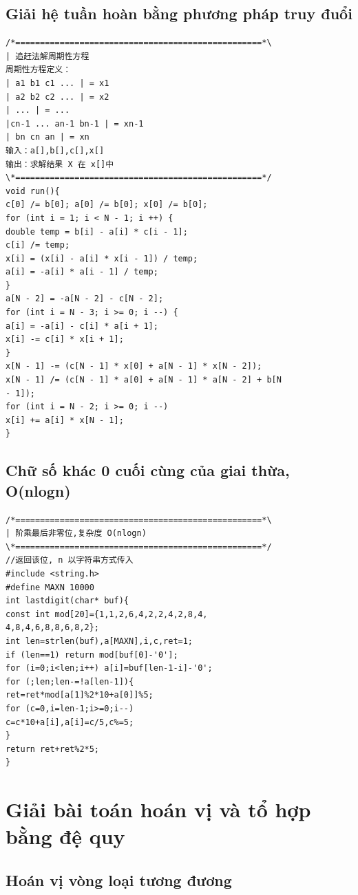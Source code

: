 \documentclass[11pt]{article}
\begin{document}
\subsection{Giải hệ tuần hoàn bằng phương pháp truy đuổi}

\begingroup
\scriptsize
\begin{verbatim}
/*==================================================*\
| 追赶法解周期性方程
周期性方程定义：
| a1 b1 c1 ... | = x1
| a2 b2 c2 ... | = x2
| ... | = ...
|cn-1 ... an-1 bn-1 | = xn-1
| bn cn an | = xn
输入：a[],b[],c[],x[]
输出：求解结果 X 在 x[]中
\*==================================================*/
void run(){
c[0] /= b[0]; a[0] /= b[0]; x[0] /= b[0];
for (int i = 1; i < N - 1; i ++) {
double temp = b[i] - a[i] * c[i - 1];
c[i] /= temp;
x[i] = (x[i] - a[i] * x[i - 1]) / temp;
a[i] = -a[i] * a[i - 1] / temp;
}
a[N - 2] = -a[N - 2] - c[N - 2];
for (int i = N - 3; i >= 0; i --) {
a[i] = -a[i] - c[i] * a[i + 1];
x[i] -= c[i] * x[i + 1];
}
x[N - 1] -= (c[N - 1] * x[0] + a[N - 1] * x[N - 2]);
x[N - 1] /= (c[N - 1] * a[0] + a[N - 1] * a[N - 2] + b[N
- 1]);
for (int i = N - 2; i >= 0; i --)
x[i] += a[i] * x[N - 1];
}
\end{verbatim}
\endgroup

\subsection{Chữ số khác 0 cuối cùng của giai thừa, O(nlogn)}

\begingroup
\scriptsize
\begin{verbatim}
/*==================================================*\
| 阶乘最后非零位,复杂度 O(nlogn)
\*==================================================*/
//返回该位, n 以字符串方式传入
#include <string.h>
#define MAXN 10000
int lastdigit(char* buf){
const int mod[20]={1,1,2,6,4,2,2,4,2,8,4,
4,8,4,6,8,8,6,8,2};
int len=strlen(buf),a[MAXN],i,c,ret=1;
if (len==1) return mod[buf[0]-'0'];
for (i=0;i<len;i++) a[i]=buf[len-1-i]-'0';
for (;len;len-=!a[len-1]){
ret=ret*mod[a[1]%2*10+a[0]]%5;
for (c=0,i=len-1;i>=0;i--)
c=c*10+a[i],a[i]=c/5,c%=5;
}
return ret+ret%2*5;
}
\end{verbatim}
\endgroup

\section{Giải bài toán hoán vị và tổ hợp bằng đệ quy}

\subsection{Hoán vị vòng loại tương đương}
\end{document}
